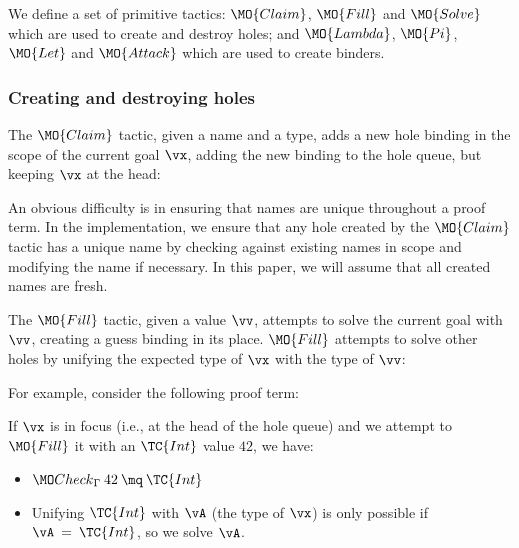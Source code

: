 We define a set of primitive tactics: $\MO{Claim}$, $\MO{Fill}$ and $\MO{Solve}$
which are used to create and destroy holes; and $\MO{Lambda}$, $\MO{Pi}$, $\MO{Let}$
and $\MO{Attack}$ which are used to create binders.

\subsubsection{Creating and destroying holes}

The $\MO{Claim}$ tactic, given a name and a type, adds a new hole binding in
the scope of the current goal $\vx$, adding the new binding to the hole queue, but
keeping $\vx$ at the head:


An obvious difficulty is in ensuring that names are unique throughout a proof term.
In the implementation, we ensure that any hole created by the $\MO{Claim}$ tactic
has a unique name by checking against existing names in scope and modifying
the name if necessary. In this paper, we will assume that all created names are fresh.

The $\MO{Fill}$ tactic, given a value $\vv$, attempts to solve the current goal
with $\vv$, creating a guess binding in its place. $\MO{Fill}$ attempts to
solve other holes by unifying the expected type of $\vx$ with the type of $\vv$:


\noindent
For example, consider the following proof term:

\DM{
\AR{
\hole{\vA}{\Set}\SC\hole{\vk}{\Nat}\SC
\hole{\vx}{\vA}\SC\hole{\vxs}{\Vect\:\vA\:\vk}\SC
\\
\hole{\vys}{\Vect\:\vA\:(\suc\:\vk)}\SC\vys
}
}

\noindent
If $\vx$ is in focus (i.e., at the head of the hole queue) and we attempt to
$\MO{Fill}$ it with an $\TC{Int}$ value $42$, we have:

\begin{itemize}
\item $\Check\:42\:\mq\:\TC{Int}$
\item Unifying $\TC{Int}$ with $\vA$ (the type of $\vx$) is only possible if
$\vA\:=\:\TC{Int}$, so we solve $\vA$.
\end{itemize}

